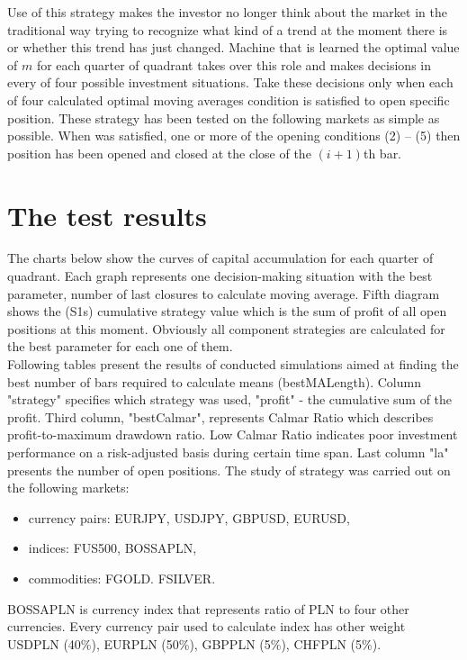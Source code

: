 \documentclass{tewiart}
\begin{document}
\indent Use of this strategy makes the investor no longer think about the market in the traditional way trying to recognize what kind of a trend at the moment there is or whether this trend has just changed. Machine that is learned the optimal value of $m$ for each quarter of quadrant takes over this role and makes decisions in every of four possible investment situations. Take these decisions only when each of four calculated optimal moving averages condition is satisfied to open specific position.
These strategy has been tested on the following markets as simple as possible. When was satisfied, one or more of the opening conditions (2) – (5) then position has been opened and closed at the close of the $(i +1)$th bar.





\section{The test results}
\indent The charts below show the curves of capital accumulation for each quarter of quadrant. Each graph represents one decision-making situation with the best parameter, number of last closures to calculate moving average. Fifth diagram shows the (S1s) cumulative strategy value which is the sum of profit of all open positions at this moment. Obviously all component strategies are calculated for the best parameter for each one of them.\\
\indent Following tables present the results of conducted simulations aimed at finding the best number of bars required to calculate means (bestMALength). Column "strategy" specifies which strategy was used, "profit" - the cumulative sum of the profit. Third column, "bestCalmar", represents Calmar Ratio which describes profit-to-maximum drawdown ratio. Low Calmar Ratio indicates poor investment performance on a risk-adjusted basis during certain time span. Last column "la" presents the number of open positions.
The study of strategy was carried out on the following markets:
\begin{itemize}
\item currency pairs: EURJPY, USDJPY, GBPUSD, EURUSD,
\item indices: FUS500, BOSSAPLN,
\item commodities: FGOLD. FSILVER.
\end{itemize}
BOSSAPLN is currency index that represents ratio of PLN to four other currencies. Every currency pair used to calculate index has other weight USDPLN (40\%), EURPLN (50\%), GBPPLN (5\%), CHFPLN (5\%).
\end{document}
